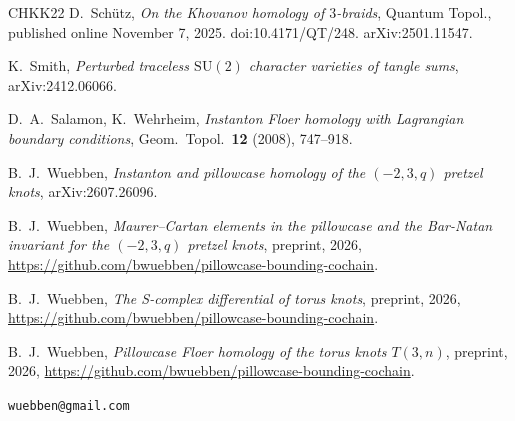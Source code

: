 \documentclass[11pt,reqno]{amsart}
\theoremstyle{plain}
\theoremstyle{definition}
\newcommand{\SU}{\mathrm{SU}(2)}
\begin{document}
\begin{thebibliography}{CHKK22}
 D.~Sch\"utz, \emph{On the Khovanov homology of $3$-braids}, Quantum Topol.,
published online November 7, 2025. doi:10.4171/QT/248. arXiv:2501.11547.

 K.~Smith, \emph{Perturbed traceless $\SU$ character varieties of tangle sums},
arXiv:2412.06066.

 D.~A.~Salamon, K.~Wehrheim, \emph{Instanton Floer homology with Lagrangian boundary
conditions}, Geom.\ Topol.\ \textbf{12} (2008), 747--918.

 B.~J.~Wuebben, \emph{Instanton and pillowcase homology of the $(-2,3,q)$ pretzel knots}, arXiv:2607.26096.

 B.~J.~Wuebben, \emph{Maurer--Cartan elements in the pillowcase and the Bar-Natan invariant for the $(-2,3,q)$ pretzel knots}, preprint, 2026, \url{https://github.com/bwuebben/pillowcase-bounding-cochain}.

 B.~J.~Wuebben, \emph{The S-complex differential of torus knots}, preprint, 2026, \url{https://github.com/bwuebben/pillowcase-bounding-cochain}.

 B.~J.~Wuebben, \emph{Pillowcase Floer homology of the torus knots $T(3,n)$}, preprint, 2026, \url{https://github.com/bwuebben/pillowcase-bounding-cochain}.

\end{thebibliography}

\bigskip
{} \texttt{wuebben@gmail.com}
\end{document}
